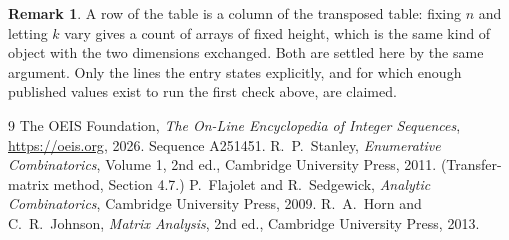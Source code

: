 \documentclass[11pt,a4paper]{article}
\theoremstyle{plain}
\theoremstyle{definition}
\newtheorem{remark}[theorem]{Remark}
\begin{document}
\begin{remark}
A row of the table is a column of the transposed table: fixing $n$ and letting $k$ vary gives a
count of arrays of fixed height, which is the same kind of object with the two dimensions
exchanged. Both are settled here by the same argument. Only the lines the entry states
explicitly, and for which enough published values exist to run the first check above, are
claimed.
\end{remark}

\begin{thebibliography}{9}
 The OEIS Foundation, \emph{The On-Line Encyclopedia of Integer
Sequences}, \url{https://oeis.org}, 2026. Sequence A251451.
 R.~P.~Stanley, \emph{Enumerative Combinatorics}, Volume 1, 2nd ed.,
Cambridge University Press, 2011. (Transfer-matrix method, Section 4.7.)
 P.~Flajolet and R.~Sedgewick, \emph{Analytic Combinatorics}, Cambridge
University Press, 2009.
 R.~A.~Horn and C.~R.~Johnson, \emph{Matrix Analysis}, 2nd ed., Cambridge
University Press, 2013.
\end{thebibliography}
\end{document}
